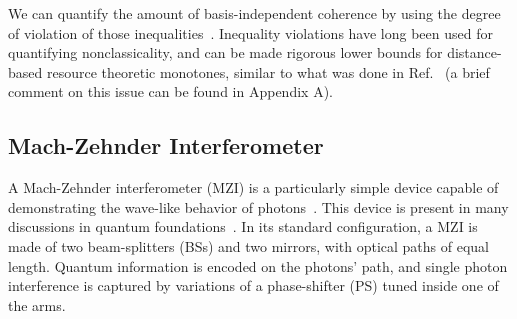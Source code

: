 \documentclass[a4paper,twocolumn,11pt,accepted=2024-01-17]{quantumarticle}
\begin{document}
We can quantify the amount of basis-independent coherence by using the degree of violation of those inequalities~\cite{giordani2020experimental}. Inequality violations have long been used for quantifying nonclassicality, and can be made rigorous lower bounds for distance-based resource theoretic monotones, similar to what was done in Ref.~\cite{brito2018quantifying} (a brief comment on this issue can be found in Appendix A).


\subsection{Mach-Zehnder Interferometer}\label{subsec: MZI}


A Mach-Zehnder interferometer (MZI) is a particularly simple device capable of demonstrating the wave-like behavior of photons~\cite{loudon2000quantum,zetie2000does}. This device is present in many discussions in quantum foundations~\cite{hardy1992existence,elitzur1993quantum,catani2021interference}. In its standard configuration, a MZI is made of two beam-splitters (BSs) and two mirrors, with optical paths of equal length. Quantum information is encoded on the photons' path, and single photon interference is captured by variations of a phase-shifter (PS) tuned inside one of the arms. 
\end{document}
